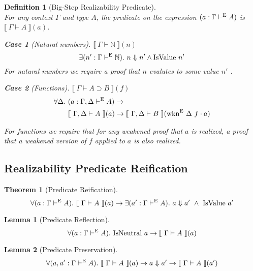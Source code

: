 \documentclass[preprint,nonatbib]{sigplanconf}
\newtheorem{defin}{Definition}
\newtheorem{subdefin}{Case}
\numberwithin{subdefin}{defin}
\theoremstyle{definition}
\newtheorem{theorem}{Theorem}
\numberwithin{subtheorem}{theorem}
\newtheorem{sublemma}{Lemma}
\numberwithin{sublemma}{theorem}
\numberwithin{corollary}{theorem}
\numberwithin{case}{theorem}
\numberwithin{slcase}{sublemma}
\numberwithin{scase}{subtheorem}
\numberwithin{lcase}{lemma}
\def\bigstep{\Downarrow}
\def\arr{\supset}
\def\marr{\rightarrow}
\def\app{\cdot}
\def\nat{\mathbb{N}}
\newcommand{\turn}[1]{\vdash^\con{#1}}
\newcommand{\all}[1]{\forall#1.~}
\newcommand{\el}[1]{\llbracket ~ #1 ~ \rrbracket}
\newcommand{\wkne}[1]{\fun{wkn}^\con{E} ~ \Delta ~ #1}
\newcommand{\con}[1]{\textmd{#1}}
\newcommand{\fun}[1]{\textmd{#1}}
\newcommand{\typm}[1]{\el{\Gamma \vdash #1}}
\newcommand{\gdtypm}[1]{\el{\Gamma, \Delta \vdash #1}}
\newcommand{\type}[1]{\Gamma \turn{E} #1}
\newcommand{\gdtype}[1]{\Gamma, \Delta \turn{E} #1}
\begin{document}
\begin{defin}[Big-Step Realizability Predicate]
\label{def:ep}
$ $\\
For any context $\Gamma$ and type $A$, the predicate on the expression
$(a : \type{A})$ is $\typm{A}(a)$.

\begin{subdefin}[Natural numbers]
$\typm{\nat}(n)$
$$
\exists (n' : \type{\nat}).~ n \bigstep n' \wedge \fun{IsValue} ~ n'
$$
For natural numbers we require a proof that $n$ evalutes to
some value $n'$ .
\end{subdefin}


\begin{subdefin}[Functions]
$\typm{A \arr B}(f)$
\begin{align*}
\all{\Delta} &(a : \gdtype{A}) \marr \\
&\gdtypm{A}(a) \marr \gdtypm{B}(\wkne{f} \app a)
\end{align*}


For functions we require that for any weakened proof that $a$
is realized, a proof that a weakened version of $f$ applied to
$a$ is also realized.
\end{subdefin}

\end{defin}

\subsection{Realizability Predicate Reification}

\begin{theorem}[Predicate Reification]
\label{thm:pred:reify}
$$
\forall (a : \type{A}).~ \typm{A}(a) \marr
\exists (a' : \type{A}).~ a \bigstep a' ~ \wedge ~ \fun{IsValue} ~ a'
$$
\end{theorem}

\begin{sublemma}[Predicate Reflection]
\label{lem:pred:refl}
$$
\forall (a : \type{A}).~ \fun{IsNeutral} ~ a \marr \typm{A}(a)
$$
\end{sublemma}

\begin{sublemma}[Predicate Preservation]
\label{lem:pred:pres}
$$
\forall (a, a' : \type{A}).~ \typm{A}(a) \marr 
a \bigstep a' \marr \typm{A}(a')
$$
\end{sublemma}
\end{document}
